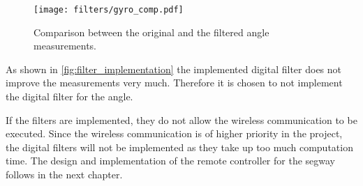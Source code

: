 \begin{figure}[H]
    \centering
    \texttt{[image: filters/gyro\_comp.pdf]}
    \caption{Comparison between the original and the filtered angle measurements.}
    \label{fig:filter_implementation}
\end{figure}
As shown in \autoref{fig:filter_implementation} the implemented digital filter does not improve the measurements very much. Therefore it is chosen to not implement the digital filter for the angle.

If the filters are implemented, they do not allow the wireless communication to be executed. Since the wireless communication is of higher priority in the project, the digital filters will not be implemented as they take up too much computation time. The design and implementation of the remote controller for the segway follows in the next chapter.